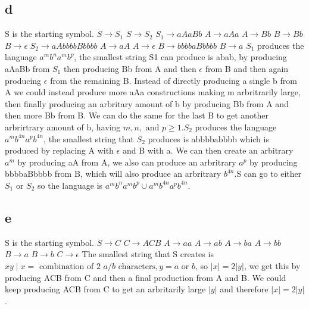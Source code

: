\documentclass[12pt]{article}
\begin{document}
\subsection*{d} S is the starting symbol. \newline
$S \rightarrow S_1$ \newline
$S \rightarrow S_2$ \newline
$S_1 \rightarrow aAaBb$ \newline
$A \rightarrow aAa$ \newline
$A \rightarrow Bb$ \newline
$B \rightarrow Bb$ \newline
$B \rightarrow \epsilon $ \newline
$S_2 \rightarrow aAbbbbBbbbb$ \newline
$A \rightarrow aA$ \newline
$A \rightarrow \epsilon$ \newline
$B \rightarrow bbbbaBbbbb$ \newline
$B \rightarrow a $ \newline
$S_1$ produces the language $a^mb^na^mb^p$, the smallest string S1 can produce is abab, by producing aAaBb from $S_1$ then producing Bb from A and then $\epsilon$ from B and then again producing $\epsilon$ from the remaining B.  Instead of directly producing a single b from A we could instead produce more aAa constructions making m arbritrarily large, then finally producing an arbritary amount of b by producing Bb from A and then more Bb from B.  We can do the same for the last B to get another arbrirtrary amount of b, having $m, n, \text{ and } p \ge 1$.\newline $S_2$ produces the language $a^mb^{4n}a^pb^{4n}$, the smallest string that $S_2$ produces is abbbbabbbb which is produced by replacing A with $\epsilon$ and B with a.  We can then create an arbitrary $a^m$ by producing aA from A, we also can produce an arbritrary $a^p$ by producing bbbbaBbbbb from B, which will also produce an arbritrary $b^{4n}$.\newline S can go to either $S_1$ or $S_2$ so the language is $a^mb^na^mb^p \cup a^mb^{4n}a^pb^{4n}$.
\subsection*{e} S is the starting symbol. \newline
$S \rightarrow C$ \newline
$C \rightarrow ACB$ \newline
$A \rightarrow aa$ \newline
$A \rightarrow ab$ \newline
$A \rightarrow ba$ \newline
$A \rightarrow bb$ \newline
$B \rightarrow a$ \newline
$B \rightarrow b$ \newline
$C \rightarrow \epsilon$ \newline
The smallest string that S creates is $xy \mid x = \text{ combination of 2 }a/b \text{ characters}, y =  a \text{ or } b$, so $|x| = 2|y|$, we get this by producing ACB from C and then a final production from A and B.  We could keep producing ACB from C to get an arbritarily large $|y|$ and therefore $|x| = 2|y|$.
\end{document}
